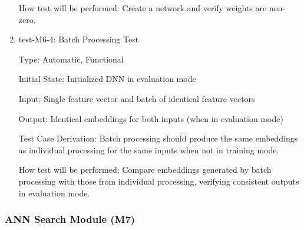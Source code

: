 \documentclass[12pt, titlepage]{article}
\begin{document}
\begin{enumerate}
  How test will be performed: Create a network and verify weights are non-zero.
  
  \item{test-M6-4: Batch Processing Test\\}

  Type: Automatic, Functional
  
  Initial State: Initialized DNN in evaluation mode
  
  Input: Single feature vector and batch of identical feature vectors
  
  Output: Identical embeddings for both inputs (when in evaluation mode)
  
  Test Case Derivation: Batch processing should produce the same embeddings as individual processing for the same inputs when not in training mode.
  
  How test will be performed: Compare embeddings generated by batch processing with those from individual processing, verifying consistent outputs in evaluation mode.
  

\end{enumerate}
\subsubsection{ANN Search Module (M7)}
\end{document}
